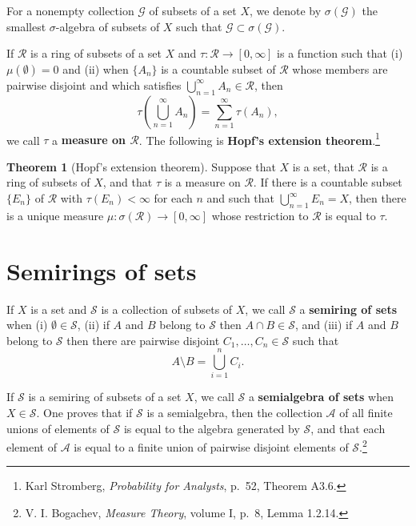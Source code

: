 \documentclass{article}
\theoremstyle{definition}
\newtheorem{theorem}{Theorem}
\theoremstyle{definition}
\begin{document}
For a nonempty collection $\mathscr{G}$ of subsets of a set $X$, we denote by $\sigma(\mathscr{G})$ the smallest $\sigma$-algebra
of subsets of $X$ such that $\mathscr{G} \subset \sigma(\mathscr{G})$.

If $\mathscr{R}$ is a ring of subsets of a set $X$ and $\tau:\mathscr{R} \to [0,\infty]$ is a function such that
(i) $\mu(\emptyset)=0$ and (ii) when $\{A_n\}$ is a countable subset of $\mathscr{R}$ whose members are pairwise
disjoint and which satisfies $\bigcup_{n=1}^\infty A_n \in \mathscr{R}$, then
\[
\tau\left( \bigcup_{n=1}^\infty A_n \right) = \sum_{n=1}^\infty \tau(A_n),
\]
we call $\tau$ a \textbf{measure on $\mathscr{R}$}. The following is \textbf{Hopf's extension theorem}.\footnote{Karl Stromberg, {\em Probability for Analysts}, p.~52, Theorem A3.6.}


\begin{theorem}[Hopf's extension theorem]
Suppose that $X$ is a set, that $\mathscr{R}$ is a ring of subsets of $X$, and that $\tau$ is a measure
on $\mathscr{R}$. If there is a countable subset $\{E_n\}$ of $\mathscr{R}$ with $\tau(E_n)<\infty$ for each $n$ and such
that $\bigcup_{n=1}^\infty E_n = X$, then there is a unique measure $\mu:\sigma(\mathscr{R}) \to [0,\infty]$ whose
restriction to $\mathscr{R}$ is equal to $\tau$.
\end{theorem}



\section{Semirings of sets}
If $X$ is a set and $\mathscr{S}$ is a collection of subsets of $X$, we call $\mathscr{S}$ a \textbf{semiring of sets} when
(i) $\emptyset \in \mathscr{S}$, (ii) if $A$ and $B$ belong to $\mathscr{S}$ then $A \cap B \in \mathscr{S}$, and (iii)
if $A$ and $B$ belong to $\mathscr{S}$ then there are pairwise disjoint $C_1,\ldots,C_n \in \mathscr{S}$ such that
\[
A \setminus B = \bigcup_{i=1}^n C_i.
\]

If $\mathscr{S}$ is a semiring of subsets of a set $X$, we call $\mathscr{S}$ a \textbf{semialgebra of sets} when $X \in \mathscr{S}$. One proves
that if $\mathscr{S}$ is a semialgebra, then the collection $\mathscr{A}$ of all finite unions of elements of $\mathscr{S}$ is equal to the algebra
generated by $\mathscr{S}$, and that each element of $\mathscr{A}$ is equal to a finite union of pairwise disjoint elements of $\mathscr{S}$.\footnote{V. I. Bogachev, {\em Measure Theory}, volume I, p.~8, Lemma 1.2.14.} 
\end{document}
